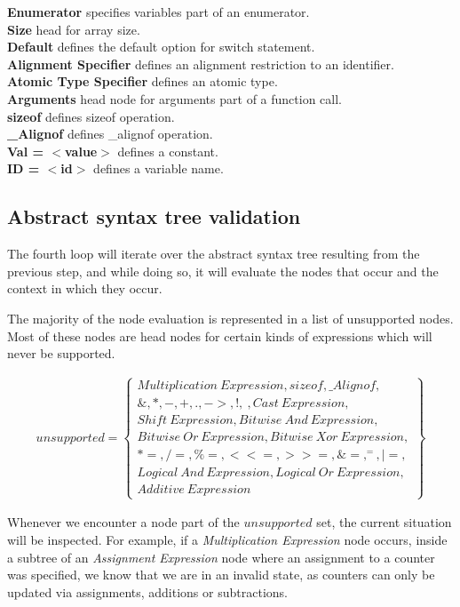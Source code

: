 \documentclass[12pt]{article}
\begin{document}
\begin{multicols}{2}
	\textbf{Enumerator} specifies variables part of an enumerator.\\
	\textbf{Size} head for array size.\\
	\textbf{Default} defines the default option for switch statement.\\
	\textbf{Alignment Specifier} defines an alignment restriction to an identifier.\\
	\textbf{Atomic Type Specifier} defines an atomic type.\\
	\textbf{Arguments} head node for arguments part of a function call.\\
	\textbf{sizeof} defines sizeof operation.\\
	\textbf{\_Alignof} defines \_alignof operation.\\
	\textbf{Val = $<$value$>$} defines a constant. \\
	\textbf{ID = $<$id$>$} defines a variable name.
\end{multicols}

\subsection{Abstract syntax tree validation}
The fourth loop will iterate over the abstract syntax tree resulting from the previous step, and while doing so, it will evaluate the nodes that occur and the context in which they occur.

The majority of the node evaluation is represented in a list of unsupported nodes. Most of these nodes are head nodes for certain kinds of expressions which will never be supported.

\begin{align*}
	unsupported = \left\{ \begin{array}{l}
		Multiplication\ Expression, sizeof, \_Alignof, \\
		\&, *, -, +, ., ->, !, ~, Cast\ Expression, \\
		Shift\ Expression, Bitwise\ And\ Expression, \\
		Bitwise\ Or\ Expression, Bitwise\ Xor\ Expression, \\
		*=, /=, \%=, <<=, >>=, \&=, ^=, |=, \\
		Logical\ And\ Expression, Logical\ Or\ Expression, \\
		Additive\ Expression
	\end{array} \right\}
\end{align*}

Whenever we encounter a node part of the $unsupported$ set, the current situation will be inspected. For example, if a \textit{Multiplication Expression} node occurs, inside a subtree of an \textit{Assignment Expression} node where an assignment to a counter was specified, we know that we are in an invalid state, as counters can only be updated via assignments, additions or subtractions. 
\end{document}
